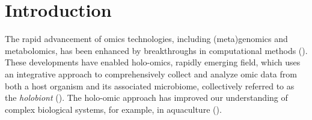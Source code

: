 \documentclass[unnumsec,webpdf,namedate,modern,large]{oup-authoring-template}%
\providecommand{\DIFaddend}{} %
\DeclareRobustCommand{\DIFaddend}{\DIFOaddend \let\includegraphics\DIFOincludegraphics} %
\begin{document}
\DIFaddend %


\maketitle

\section{Introduction}

The rapid advancement of omics technologies, including (meta)genomics and metabolomics, has been enhanced by breakthroughs in computational methods (\cite{moreno-indias_statistical_2021,marcos-zambrano_toolbox_2023,santamaria_bioinformatic_2024}).
These developments have enabled holo-omics, rapidly emerging field, which uses an integrative approach to comprehensively collect and analyze omic data from both a host organism and its associated microbiome, collectively referred to as the {\it holobiont} (\cite{nyholmHoloOmicsIntegratedHostMicrobiota2020,limborgAppliedHologenomicsFeasibility2018,odriozola_practical_2024}). The holo-omic approach has improved our understanding of complex biological systems, for example, in aquaculture (\cite{limborgAppliedHologenomicsFeasibility2018,atlantic_salmon}).
\end{document}
